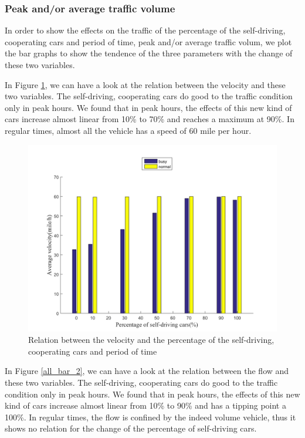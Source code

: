 \documentclass[a4paper]{article}
\begin{document}
	\subsubsection{Peak and/or average traffic volume }%
	In order to show the effects on the traffic of the percentage of the self-driving, cooperating cars and period of time, peak and/or average traffic volum, we plot the bar graphs to show the tendence of the three parameters with the change of these two variables.

	In Figure \ref{all_bar_1}, we can have a look at the relation between the velocity and these two variables. The self-driving, cooperating cars do good to the traffic condition only in peak hours. We found that in peak hours, the effects of this new kind of cars increase almost linear from 10\% to 70\% and reaches a maximum at 90\%. In regular times, almost all the vehicle has a speed of 60 mile per hour.

	\begin{figure}[H]
		\centering
		\includegraphics[scale=0.5]{../imgs/all_bar_1}
		\caption{Relation between the velocity and the percentage of the self-driving, cooperating cars and period of time}
		\label{all_bar_1}
	\end{figure}

	In Figure \ref{all_bar_2}, we can have a look at the relation between the flow and these two variables. The self-driving, cooperating cars do good to the traffic condition only in peak hours. We found that in peak hours, the effects of this new kind of cars increase almost linear from 10\% to 90\% and has a tipping point a 100\%. In regular times, the flow is confined by the indeed volume vehicle, thus it shows no relation for the change of the percentage of self-driving cars.
\end{document}
